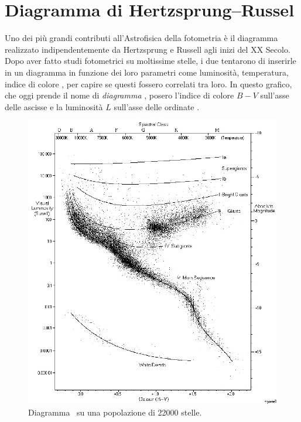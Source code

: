 \section{Diagramma di Hertzsprung--Russel}
    Uno dei più grandi contributi all'Astrofisica della fotometria è il diagramma realizzato indipendentemente da Hertzsprung e Russell agli inizi del XX Secolo. Dopo aver fatto studi fotometrici su moltissime stelle, i due tentarono di inserirle in un diagramma in funzione dei loro parametri come luminosità, temperatura, indice di colore \myetc, per capire se questi fossero correlati tra loro. In questo grafico, che oggi prende il nome di \emph{diagramma \hr}, posero l'indice di colore $B - V$ sull'asse delle ascisse e la luminosità $L$ sull'asse delle ordinate .
    \begin{figure}
        \centering
        \includegraphics[width=\imagebig]{images/fotometria/HR-diagram-1.png}
        \caption{Diagramma \hr\ su una popolazione di \num{22000} stelle.}
        \label{fig:HR-diagram-1}
    \end{figure}
